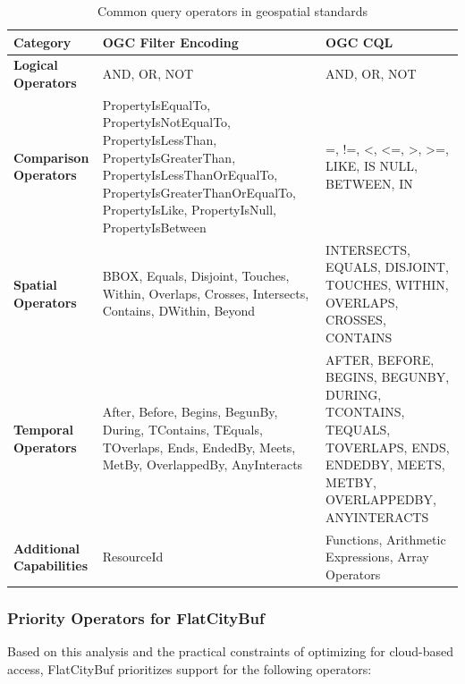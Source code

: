 \begin{table}[ht]
  \centering
  \caption{Common query operators in geospatial standards}
  \label{tab:query_operators}
  \begin{tabular}{p{3cm}p{5cm}p{5cm}}
    \hline
    \textbf{Category} & \textbf{OGC Filter Encoding} & \textbf{OGC CQL} \\
    \hline
    \textbf{Logical Operators} &
    AND, OR, NOT &
    AND, OR, NOT \\
    \hline
    \textbf{Comparison Operators} &
    PropertyIsEqualTo, PropertyIsNotEqualTo, PropertyIsLessThan, PropertyIsGreaterThan, PropertyIsLessThanOrEqualTo, PropertyIsGreaterThanOrEqualTo, PropertyIsLike, PropertyIsNull, PropertyIsBetween &
    =, !=, <, <=, >, >=, LIKE, IS NULL, BETWEEN, IN \\
    \hline
    \textbf{Spatial Operators} &
    BBOX, Equals, Disjoint, Touches, Within, Overlaps, Crosses, Intersects, Contains, DWithin, Beyond &
    INTERSECTS, EQUALS, DISJOINT, TOUCHES, WITHIN, OVERLAPS, CROSSES, CONTAINS \\
    \hline
    \textbf{Temporal Operators} &
    After, Before, Begins, BegunBy, During, TContains, TEquals, TOverlaps, Ends, EndedBy, Meets, MetBy, OverlappedBy, AnyInteracts &
    AFTER, BEFORE, BEGINS, BEGUNBY, DURING, TCONTAINS, TEQUALS, TOVERLAPS, ENDS, ENDEDBY, MEETS, METBY, OVERLAPPEDBY, ANYINTERACTS \\
    \hline
    \textbf{Additional Capabilities} &
    ResourceId &
    Functions, Arithmetic Expressions, Array Operators \\
    \hline
  \end{tabular}
\end{table}

\subsubsection{Priority Operators for FlatCityBuf}
\label{methodology:attribute_index:query_requirements:priorities}

Based on this analysis and the practical constraints of optimizing for cloud-based access, FlatCityBuf prioritizes support for the following operators:

